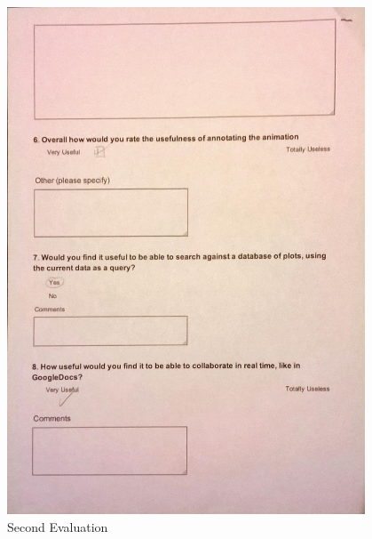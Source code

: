 \begin{figure}[h!]
    \centering
    \includegraphics[width=0.95\textwidth]{images/user_eval/user_eval_10.jpg}
    \caption{Second Evaluation}
\end{figure}

